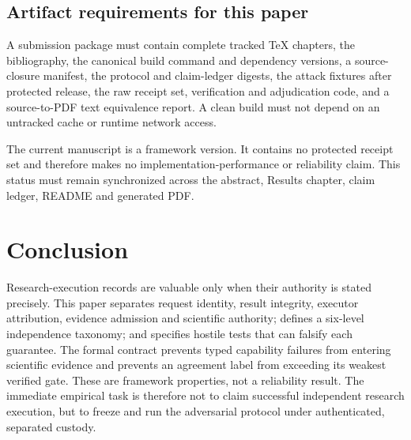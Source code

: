 \subsection{Artifact requirements for this paper}

A submission package must contain complete tracked TeX chapters, the bibliography,
the canonical build command and dependency versions, a source-closure manifest,
the protocol and claim-ledger digests, the attack fixtures after protected release,
the raw receipt set, verification and adjudication code, and a source-to-PDF text
equivalence report. A clean build must not depend on an untracked cache or runtime
network access.

The current manuscript is a framework version. It contains no protected receipt
set and therefore makes no implementation-performance or reliability claim. This
status must remain synchronized across the abstract, Results chapter, claim ledger,
README and generated PDF.

\section{Conclusion}

Research-execution records are valuable only when their authority is stated
precisely. This paper separates request identity, result integrity, executor
attribution, evidence admission and scientific authority; defines a six-level
independence taxonomy; and specifies hostile tests that can falsify each guarantee.
The formal contract prevents typed capability failures from entering scientific
evidence and prevents an agreement label from exceeding its weakest verified gate.
These are framework properties, not a reliability result. The immediate empirical
task is therefore not to claim successful independent research execution, but to
freeze and run the adversarial protocol under authenticated, separated custody.

